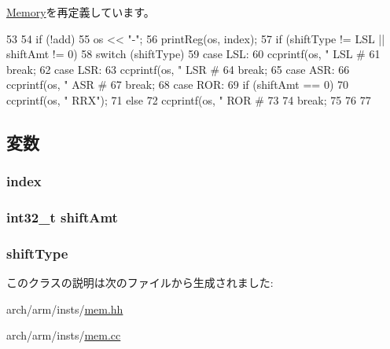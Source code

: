 \hyperlink{classArmISA_1_1Memory_a8ff7c6b5299bfe7b627754684ca9c387}{Memory}を再定義しています。


\begin{DoxyCode}
53 {
54     if (!add)
55         os << "-";
56     printReg(os, index);
57     if (shiftType != LSL || shiftAmt != 0) {
58         switch (shiftType) {
59           case LSL:
60             ccprintf(os, " LSL #%
61             break;
62           case LSR:
63             ccprintf(os, " LSR #%
64             break;
65           case ASR:
66             ccprintf(os, " ASR #%
67             break;
68           case ROR:
69             if (shiftAmt == 0) {
70                 ccprintf(os, " RRX");
71             } else {
72                 ccprintf(os, " ROR #%
73             }
74             break;
75         }
76     }
77 }
\end{DoxyCode}


\subsection{変数}
\hypertarget{classArmISA_1_1MemoryReg_a2702f107e28b9d4c6161cead23d7e0b4}{
\subsubsection[{index}]{ {\bf index}}}
\label{classArmISA_1_1MemoryReg_a2702f107e28b9d4c6161cead23d7e0b4}
\hypertarget{classArmISA_1_1MemoryReg_a378dfadeb317c390962c147be928d92d}{
\subsubsection[{shiftAmt}]{\setlength{\rightskip}{0pt plus 5cm}int32\_\-t {\bf shiftAmt}}}
\label{classArmISA_1_1MemoryReg_a378dfadeb317c390962c147be928d92d}
\hypertarget{classArmISA_1_1MemoryReg_ae5b7df4bd366c5419743bf5f679485b9}{
\subsubsection[{shiftType}]{ {\bf shiftType}}}
\label{classArmISA_1_1MemoryReg_ae5b7df4bd366c5419743bf5f679485b9}


このクラスの説明は次のファイルから生成されました:\begin{DoxyCompactItemize}
\item 
arch/arm/insts/\hyperlink{arm_2insts_2mem_8hh}{mem.hh}\item 
arch/arm/insts/\hyperlink{arm_2insts_2mem_8cc}{mem.cc}\end{DoxyCompactItemize}
